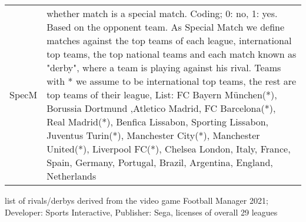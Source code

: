 \documentclass[12pt,dvipsnames]{article}%
\begin{document}
\begin{table}[h]
\begin{tabular}{ c | p{12cm}  }
SpecM & whether match is a special match. Coding; 0: no, 1: yes. Based on the opponent team. As Special Match we define matches against the top teams of each league, international top teams, the top national teams and each match known as "derby"\footnotemark[6], where a team is playing against his rival. Teams with * we assume to be international top teams, the rest are top teams of their league,  List: FC Bayern M{\"u}nchen(*), Borussia Dortmund ,Atletico Madrid, FC Barcelona(*), Real Madrid(*), Benfica Lissabon, Sporting Lissabon, Juventus Turin(*), Manchester City(*), Manchester United(*), Liverpool FC(*), Chelsea London,  Italy, France, Spain, Germany, Portugal, Brazil, Argentina, England, Netherlands\\


 \end{tabular}
 
 \vspace{+0.5cm}
 
 \footnotemark[6] list of rivals/derbys derived from the video game Football Manager 2021; \newline  \hspace*{-3mm} Developer: Sports Interactive, Publisher: Sega, licenses of overall 29 
 \newline \hspace*{-123mm} leagues 
 
 \end{table}

\pagebreak
 
\end{document}
